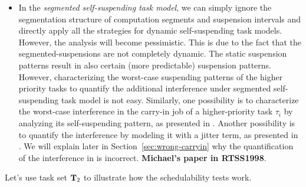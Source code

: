 \begin{itemize}
\begin{itemize}
\item In the \emph{segmented self-suspending task model}, we can simply ignore the segmentation structure of computation segments and suspension intervals and directly apply all the strategies for dynamic self-suspending task models. However, the analysis will become pessimistic. This is due to the fact that the segmented-suspensions are not completely dynamic. The static suspension patterns result in also certain (more predictable) suspension patterns. However, characterizing the worst-case suspending patterns of the higher priority tasks to quantify the additional interference under segmented self-suspending task model is not easy. Similarly, one possibility is to characterize the worst-case interference in the carry-in job of a higher-priority task $\tau_i$ by analyzing its self-suspending pattern, as presented in \cite{Huang:multiseg}. Another possibility is to  quantify the interference by modeling it with a jitter term, as presented in \cite{RTCSA-BletsasA05}. We will explain later in Section~\ref{sec:wrong-carryin} why the quantification of the interference in \cite{RTCSA-BletsasA05} is incorrect. {\bf Michael's paper in RTSS1998}.
\end{itemize}


Let's use task set ${\bf T}_2$ to illustrate how the schedulability tests work. 
 

\end{itemize}
